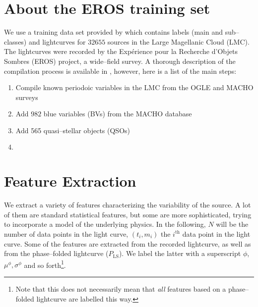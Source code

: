 \section{About the EROS training set}

We use a training data set provided by \citet{kim2014} which contains labels (main and sub--classes) and lightcurves for $32655$ sources in the Large Magellanic Cloud (LMC). The lightcurves were recorded by the Expérience pour la Recherche d’Objets Sombres (EROS) project, a wide--field survey. A thorough description of the compilation process is available in \citet{kim2014}, however, here is a list of the main steps:

\begin{enumerate}
\item Compile known periodoic variables in the LMC from the OGLE and MACHO surveys
\item Add $982$ blue variables (BVs) from the MACHO database
\item Add 565 quasi--stellar objects (QSOs)
\item 
\end{enumerate}


\section{Feature Extraction}

We extract a variety of features characterizing the variability of the source. A lot of them are standard statistical features, but some are more sophisticated, trying to incorporate a model of the underlying physics. In the following, $N$ will be the number of data points in the light curve, $(t_i, m_i)$ the $i^{\text{th}}$ data point in the light curve. Some of the features are extracted from the recorded lightcurve, as well as from the phase--folded lightcurve ($P_{\text{LS}}$). We label the latter with a superscript $\phi$, \eg $\mu^\phi, \sigma^\phi$ and so forth\footnote{Note that this does not necessarily mean that \emph{all} features based on a phase--folded lightcurve are labelled this way.}.

